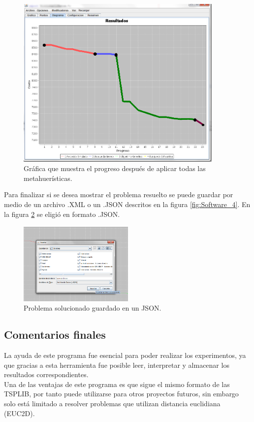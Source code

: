     \begin{figure}[hbtp]
        \centering
            \includegraphics[width=0.9\textwidth]{Software/Imagenes/Software_Uso_9.png}
            \caption{Gráfica que muestra el progreso después de aplicar todas las metahuerísticas.}
            \label{fig:Software_Uso_9}
    \end{figure}  
\clearpage \newpage

\hspace*{1cm}Para finalizar si se desea mostrar el problema resuelto se puede guardar por medio de un archivo .XML o un .JSON descritos en la figura \ref {fig:Software_4}. En la figura \ref {fig:Software_Uso_10} se eligió en formato .JSON.\\
    \begin{figure}[hbtp]
        \centering
            \includegraphics[width=0.5\textwidth]{Software/Imagenes/Software_Uso_10.png}
            \caption{Problema solucionado guardado en un JSON.}
            \label{fig:Software_Uso_10}
    \end{figure}

\subsection{Comentarios finales}
La ayuda de este programa fue esencial para poder realizar los experimentos, ya que gracias a esta herramienta fue posible leer, interpretar y almacenar los resultados correspondientes.\\
\hspace*{1cm}Una de las ventajas de este programa es que sigue el mismo formato de las TSPLIB, por tanto puede utilizarse para otros proyectos futuros, sin embargo solo está limitado a resolver problemas que utilizan distancia euclidiana (EUC2D).\\